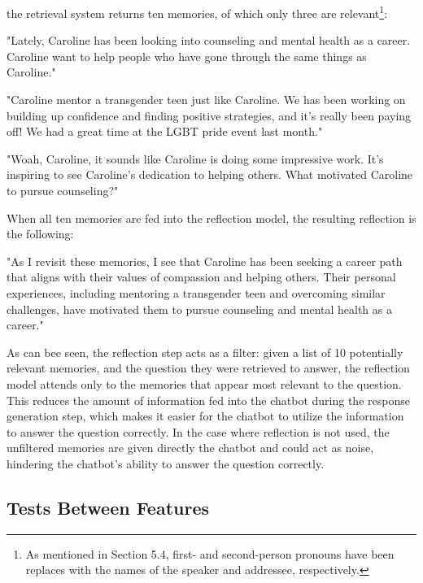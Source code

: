 \noindent the retrieval system returns ten memories, of which only three are relevant\footnote{As mentioned in Section 5.4, first- and second-person pronouns have been replaces with the names of the speaker and addressee, respectively.}:

\begin{displayquote}
"Lately, Caroline has been looking into counseling and mental health as a career. Caroline want to help people who have gone through the same things as Caroline."

"Caroline mentor a transgender teen just like Caroline. We has been working on building up confidence and finding positive strategies, and it's really been paying off! We had a great time at the LGBT pride event last month."

"Woah, Caroline, it sounds like Caroline is doing some impressive work. It's inspiring to see Caroline's dedication to helping others. What motivated Caroline to pursue counseling?"
\end{displayquote}

\noindent When all ten memories are fed into the reflection model, the resulting reflection is the following:

\begin{displayquote}
"As I revisit these memories, I see that Caroline has been seeking a career path that aligns with their values of compassion and helping others. Their personal experiences, including mentoring a transgender teen and overcoming similar challenges, have motivated them to pursue counseling and mental health as a career."
\end{displayquote}

\noindent As can bee seen, the reflection step acts as a filter: given a list of 10 potentially relevant memories, and the question they were retrieved to answer, the reflection model attends only to the memories that appear most relevant to the question. This reduces the amount of information fed into the chatbot during the response generation step, which makes it easier for the chatbot to utilize the information to answer the question correctly. In the case where reflection is not used, the unfiltered memories are given directly the chatbot and could act as noise, hindering the chatbot's ability to answer the question correctly.



\subsection{Tests Between Features}

